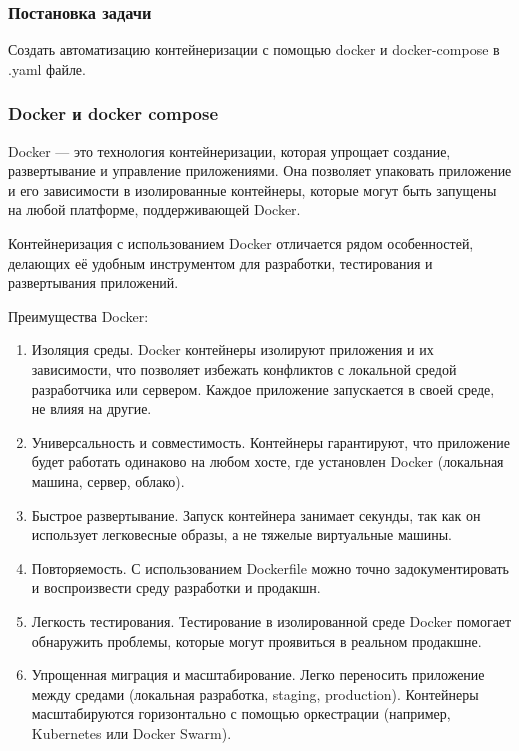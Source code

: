 \documentclass[pract]{SCWorks}
\begin{document}
\subsubsection{Постановка задачи}
Создать автоматизацию контейнеризации с помощью docker и docker-compose
в .yaml файле.

\subsubsection{Docker и docker compose}

Docker — это технология контейнеризации, которая упрощает создание, 
развертывание и управление приложениями. Она позволяет упаковать приложение 
и его зависимости в изолированные контейнеры, которые могут быть запущены 
на любой платформе, поддерживающей Docker. 

Контейнеризация с использованием Docker отличается рядом особенностей, 
делающих её удобным инструментом для разработки, тестирования и 
развертывания приложений.

Преимущества Docker:
\begin{enumerate}
    \item Изоляция среды. Docker контейнеры изолируют приложения и их 
    зависимости, что позволяет избежать конфликтов с локальной средой 
    разработчика или сервером. Каждое приложение запускается в своей среде, 
    не влияя на другие.

    \item Универсальность и совместимость. Контейнеры гарантируют, что 
    приложение будет работать одинаково на любом хосте, где установлен 
    Docker (локальная машина, сервер, облако).

    \item Быстрое развертывание. Запуск контейнера занимает секунды, так как
     он использует легковесные образы, а не тяжелые виртуальные машины.

    \item Повторяемость. С использованием Dockerfile можно точно 
    задокументировать и воспроизвести среду разработки и продакшн.

    \item Легкость тестирования. Тестирование в изолированной среде Docker 
    помогает обнаружить проблемы, которые могут проявиться в реальном продакшне.

    \item Упрощенная миграция и масштабирование. Легко переносить приложение 
    между средами (локальная разработка, staging, production). Контейнеры 
    масштабируются горизонтально с помощью оркестрации (например, Kubernetes 
    или Docker Swarm).
\end{enumerate}
    
\end{document}
